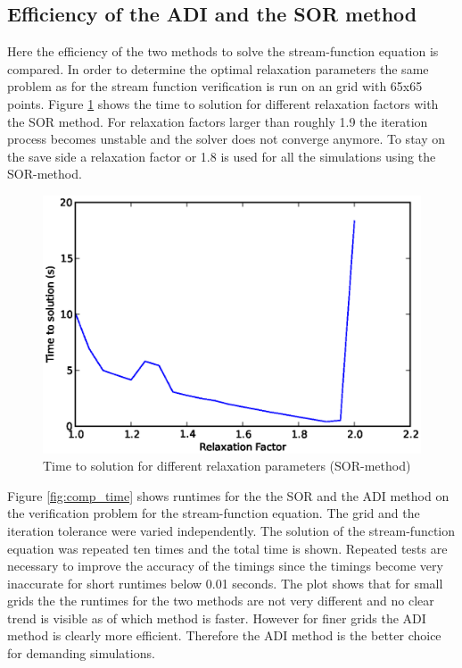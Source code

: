 \subsection{Efficiency of the ADI and the SOR method}
Here the efficiency of the two methods to solve the stream-function equation is compared. In order to determine the optimal relaxation parameters the same problem as for the stream function verification is run on an grid with 65x65 points. Figure \ref{fig:relax_sor} shows the time to solution for different relaxation factors with the SOR method. For relaxation factors larger than roughly 1.9 the iteration process becomes unstable and the solver does not converge anymore. To stay on the save side  a relaxation factor or 1.8 is used for all the simulations using the SOR-method.
%
\begin{figure}[H]
\centering
\includegraphics[scale=0.8]{"figs/relax_factor"}
\caption{Time to solution for different relaxation parameters (SOR-method)}
\label{fig:relax_sor}
\end{figure}
%
Figure \ref{fig:comp_time} shows runtimes for the the SOR and the ADI method on the verification problem for the stream-function equation. The grid and the iteration tolerance were varied independently. The solution of the stream-function equation was repeated ten times and the total time is shown. Repeated tests are necessary to improve the accuracy of the timings since the timings become very inaccurate for short runtimes below 0.01 seconds. The plot shows that for small grids the the runtimes for the two methods are not very different and no clear trend is visible as of which method is faster. However for finer grids the ADI method is clearly more efficient. Therefore the ADI method is the better choice for demanding simulations.
